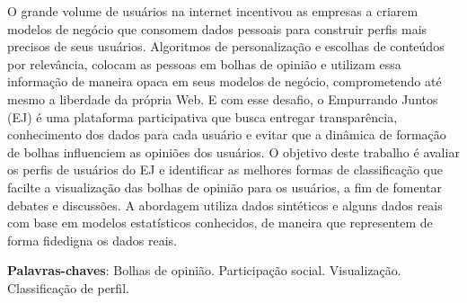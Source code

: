 \begin{resumo}

O grande volume de usuários na internet incentivou as empresas a criarem modelos de negócio que consomem dados pessoais para construir perfis mais precisos de seus usuários. Algoritmos de personalização e escolhas de conteúdos por relevância, colocam as pessoas em bolhas de opinião e utilizam essa informação de maneira opaca em seus modelos de negócio, comprometendo até mesmo a liberdade da própria Web. E com esse desafio, o Empurrando Juntos (EJ) é uma plataforma participativa que busca entregar transparência, conhecimento dos dados para cada usuário e evitar que a dinâmica de formação de bolhas influenciem as opiniões dos usuários. O objetivo deste trabalho é avaliar os perfis de usuários do EJ e identificar as melhores formas de classificação que facilte a visualização das bolhas de opinião para os usuários, a fim de fomentar debates e discussões. A abordagem utiliza dados sintéticos e alguns dados reais com base em modelos estatísticos conhecidos, de maneira que representem de forma fidedigna os dados reais.


 \vspace{\onelineskip}
    
 \noindent
 \textbf{Palavras-chaves}: Bolhas de opinião. Participação social. Visualização. Classificação de perfil.
\end{resumo}

